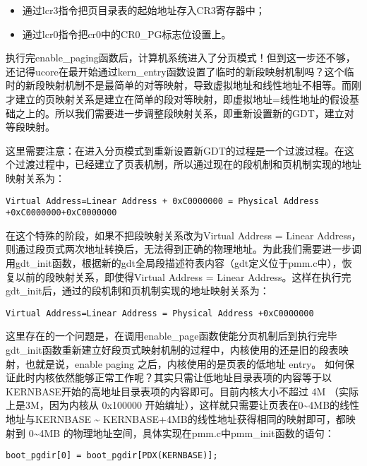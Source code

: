 \begin{itemize}
\item
  通过lcr3指令把页目录表的起始地址存入CR3寄存器中；
\item
  通过lcr0指令把cr0中的CR0\_PG标志位设置上。
\end{itemize}

执行完enable\_paging函数后，计算机系统进入了分页模式！但到这一步还不够，还记得ucore在最开始通过kern\_entry函数设置了临时的新段映射机制吗？这个临时的新段映射机制不是最简单的对等映射，导致虚拟地址和线性地址不相等。而刚才建立的页映射关系是建立在简单的段对等映射，即虚拟地址=线性地址的假设基础之上的。所以我们需要进一步调整段映射关系，即重新设置新的GDT，建立对等段映射。

这里需要注意：在进入分页模式到重新设置新GDT的过程是一个过渡过程。在这个过渡过程中，已经建立了页表机制，所以通过现在的段机制和页机制实现的地址映射关系为：

\begin{lstlisting}
Virtual Address=Linear Address + 0xC0000000 = Physical Address +0xC0000000+0xC0000000
\end{lstlisting}

在这个特殊的阶段，如果不把段映射关系改为Virtual Address = Linear
Address，则通过段页式两次地址转换后，无法得到正确的物理地址。为此我们需要进一步调用gdt\_init函数，根据新的gdt全局段描述符表内容（gdt定义位于pmm.c中），恢复以前的段映射关系，即使得Virtual
Address = Linear
Address。这样在执行完gdt\_init后，通过的段机制和页机制实现的地址映射关系为：

\begin{lstlisting}
Virtual Address=Linear Address = Physical Address +0xC0000000
\end{lstlisting}

这里存在的一个问题是，在调用enable\_page函数使能分页机制后到执行完毕gdt\_init函数重新建立好段页式映射机制的过程中，内核使用的还是旧的段表映射，也就是说，enable
paging 之后，内核使用的是页表的低地址 entry。
如何保证此时内核依然能够正常工作呢？其实只需让低地址目录表项的内容等于以KERNBASE开始的高地址目录表项的内容即可。目前内核大小不超过
4M （实际上是3M，因为内核从 0x100000
开始编址），这样就只需要让页表在0\textasciitilde{}4MB的线性地址与KERNBASE
\textasciitilde{} KERNBASE+4MB的线性地址获得相同的映射即可，都映射到
0\textasciitilde{}4MB
的物理地址空间，具体实现在pmm.c中pmm\_init函数的语句：

\begin{lstlisting}
boot_pgdir[0] = boot_pgdir[PDX(KERNBASE)];
\end{lstlisting}

